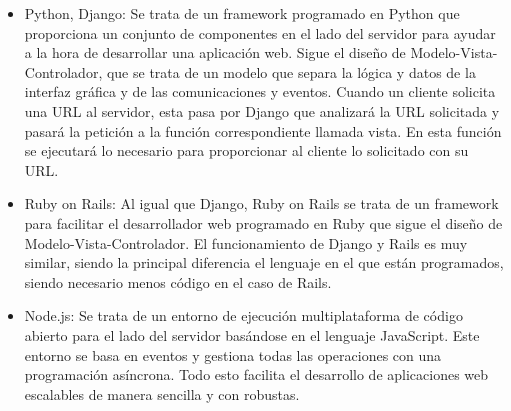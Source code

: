 \begin{itemize}
	\item Python, Django: Se trata de un framework programado en Python que proporciona un conjunto de componentes en el lado del servidor para ayudar a la hora de desarrollar una aplicación web. Sigue el diseño de Modelo-Vista-Controlador, que se trata de un modelo que separa la lógica y datos de la interfaz gráfica y de las comunicaciones y eventos. Cuando un cliente solicita una URL al servidor, esta pasa por Django que analizará la URL solicitada y pasará la petición a la función correspondiente llamada vista. En esta función se ejecutará lo necesario para proporcionar al cliente lo solicitado con su URL.
	\item Ruby on Rails: Al igual que Django, Ruby on Rails se trata de un framework para facilitar el desarrollador web programado en Ruby que sigue el diseño de Modelo-Vista-Controlador. El funcionamiento de Django y Rails es muy similar, siendo la principal diferencia el lenguaje en el que están programados, siendo necesario menos código en el caso de Rails.
	\item Node.js: Se trata de un entorno de ejecución multiplataforma de código abierto para el lado del servidor basándose en el lenguaje JavaScript. Este entorno se basa en eventos y gestiona todas las operaciones con una programación asíncrona. Todo esto facilita el desarrollo de aplicaciones web escalables de manera sencilla y con robustas.
\end{itemize}

